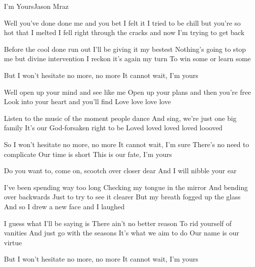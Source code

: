 \begin{Song}{I'm Yours}{Jason Mraz}
\begin{multicols}{2}

\begin{Verse}
Well you've done done me and you bet I felt it
I tried to be chill but you're so hot that I melted
I fell right through the cracks
and now I'm trying to get back
\espaceInterStrophe

Before the cool done run out
I'll be giving it my bestest
Nothing's going to stop me but divine intervention
I reckon it's again my turn
To win some or learn some
\end{Verse}
\espaceInterStrophe

\begin{Chorus}
But I won't hesitate no more, no more
It cannot wait, I'm yours
\end{Chorus}
\espaceInterStrophe

\begin{Verse}
Well open up your mind and see like me
Open up your plans and then you're free
Look into your heart and you'll find
Love love love love
\espaceInterStrophe

Listen to the music of the moment people dance
And sing, we're just one big family
It's our God-forsaken right to be
Loved loved loved loved loooved
\end{Verse}
\espaceInterStrophe

\begin{Chorus}
So I won't hesitate no more, no more
It cannot wait, I'm sure
There's no need to complicate
Our time is short
This is our fate, I'm yours
\end{Chorus}
\espaceInterStrophe

\begin{Verse}
Do you want to, come on, scootch over closer dear
And I will nibble your ear
\espaceInterStrophe

I've been spending way too long
Checking my tongue in the mirror
And bending over backwards
Just to try to see it clearer
But my breath fogged up the glass
And so I drew a new face and I laughed
\espaceInterStrophe

I guess what I'll be saying is
There ain't no better reason
To rid yourself of vanities
And just go with the seasons
It's what we aim to do
Our name is our virtue
\end{Verse}
\espaceInterStrophe

\begin{Chorus}
But I won't hesitate no more, no more
It cannot wait, I'm yours
\end{Chorus}
\espaceInterStrophe


\end{multicols}
\end{Song}
